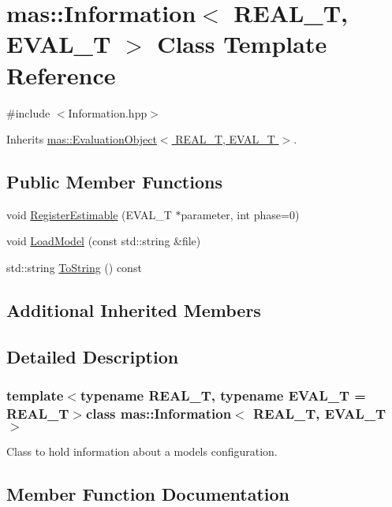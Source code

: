 \hypertarget{classmas_1_1_information}{}\section{mas\+:\+:Information$<$ R\+E\+A\+L\+\_\+\+T, E\+V\+A\+L\+\_\+\+T $>$ Class Template Reference}
\label{classmas_1_1_information}


{\ttfamily \#include $<$Information.\+hpp$>$}



Inherits \hyperlink{classmas_1_1_evaluation_object}{mas\+::\+Evaluation\+Object$<$ R\+E\+A\+L\+\_\+\+T, E\+V\+A\+L\+\_\+\+T $>$}.

\subsection*{Public Member Functions}
\begin{DoxyCompactItemize}
\item 
void \hyperlink{classmas_1_1_information_a94e2ca5cb7f84694c300a351243c3a3b}{Register\+Estimable} (E\+V\+A\+L\+\_\+\+T $\ast$parameter, int phase=0)
\item 
void \hyperlink{classmas_1_1_information_a4b8303a3b095a9185fd371a6db2f9412}{Load\+Model} (const std\+::string \&file)
\item 
std\+::string \hyperlink{classmas_1_1_information_a9dec6b9486d758b6c8c567f1c29ad59a}{To\+String} () const 
\end{DoxyCompactItemize}
\subsection*{Additional Inherited Members}


\subsection{Detailed Description}
\subsubsection*{template$<$typename R\+E\+A\+L\+\_\+\+T, typename E\+V\+A\+L\+\_\+\+T = R\+E\+A\+L\+\_\+\+T$>$class mas\+::\+Information$<$ R\+E\+A\+L\+\_\+\+T, E\+V\+A\+L\+\_\+\+T $>$}

Class to hold information about a models configuration. 

\subsection{Member Function Documentation}
\hypertarget{classmas_1_1_information_a4b8303a3b095a9185fd371a6db2f9412}{}
